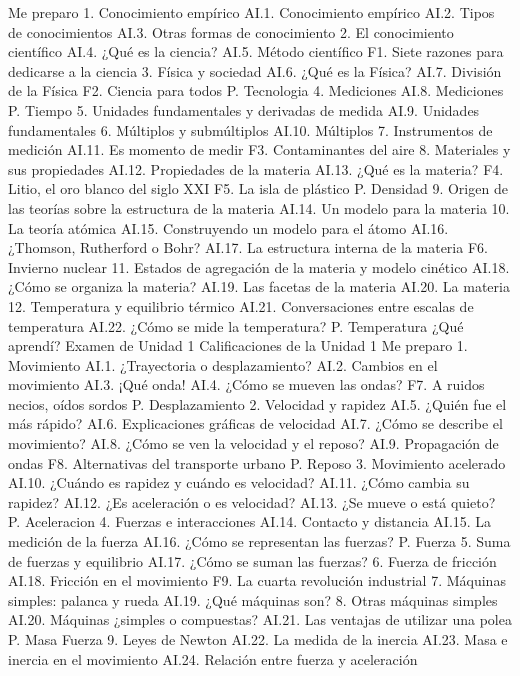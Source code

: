 Me preparo
1.	Conocimiento empírico
AI.1.	Conocimiento empírico
AI.2.	Tipos de conocimientos
AI.3.	Otras formas de conocimiento
2.	El conocimiento científico
AI.4.	¿Qué es la ciencia?
AI.5.	Método científico
F1.	Siete razones para dedicarse a la ciencia
3.	Física y sociedad
AI.6.	¿Qué es la Física?
AI.7.	División de la Física
F2.	Ciencia para todos
P.	Tecnologia
4.	Mediciones
AI.8.	Mediciones
P.	Tiempo
5.	Unidades fundamentales y derivadas de medida
AI.9.	Unidades fundamentales
6.	Múltiplos y submúltiplos
AI.10.	Múltiplos
7.	Instrumentos de medición
AI.11.	Es momento de medir
F3.	Contaminantes del aire
8.	Materiales y sus propiedades
AI.12.	Propiedades de la materia
AI.13.	¿Qué es la materia?
F4.	Litio, el oro blanco del siglo XXI
F5.	La isla de plástico
P.	Densidad
9.	Origen de las teorías sobre la estructura de la materia
AI.14.	Un modelo para la materia
10.	La teoría atómica
AI.15.	Construyendo un modelo para el átomo
AI.16.	¿Thomson, Rutherford o Bohr?
AI.17.	La estructura interna de la materia
F6.	Invierno nuclear
11.	Estados de agregación de la materia y modelo cinético
AI.18.	¿Cómo se organiza la materia?
AI.19.	Las facetas de la materia
AI.20.	La materia
12.	Temperatura y equilibrio térmico
AI.21.	Conversaciones entre escalas de temperatura
AI.22.	¿Cómo se mide la temperatura?
P.	Temperatura
¿Qué aprendí?
Examen de Unidad 1
Calificaciones de la Unidad 1
Me preparo
1.	Movimiento
AI.1.	¿Trayectoria o desplazamiento?
AI.2.	Cambios en el movimiento
AI.3.	¡Qué onda!
AI.4.	¿Cómo se mueven las ondas?
F7.	A ruidos necios, oídos sordos
P.	Desplazamiento
2.	Velocidad y rapidez
AI.5.	¿Quién fue el más rápido?
AI.6.	Explicaciones gráficas de velocidad
AI.7.	¿Cómo se describe el movimiento?
AI.8.	¿Cómo se ven la velocidad y el reposo?
AI.9.	Propagación de ondas
F8.	Alternativas del transporte urbano
P.	Reposo
3.	Movimiento acelerado
AI.10.	¿Cuándo es rapidez y cuándo es velocidad?
AI.11.	¿Cómo cambia su rapidez?
AI.12.	¿Es aceleración o es velocidad?
AI.13.	¿Se mueve o está quieto?
P.	Aceleracion
4.	Fuerzas e interacciones
AI.14.	Contacto y distancia
AI.15.	La medición de la fuerza
AI.16.	¿Cómo se representan las fuerzas?
P.	Fuerza
5.	Suma de fuerzas y equilibrio
AI.17.	¿Cómo se suman las fuerzas?
6.	Fuerza de fricción
AI.18.	Fricción en el movimiento
F9.	La cuarta revolución industrial
7.	Máquinas simples: palanca y rueda
AI.19.	¿Qué máquinas son?
8.	Otras máquinas simples
AI.20.	Máquinas ¿simples o compuestas?
AI.21.	Las ventajas de utilizar una polea
P.	Masa Fuerza
9.	Leyes de Newton
AI.22.	La medida de la inercia
AI.23.	Masa e inercia en el movimiento
AI.24.	Relación entre fuerza y aceleración
